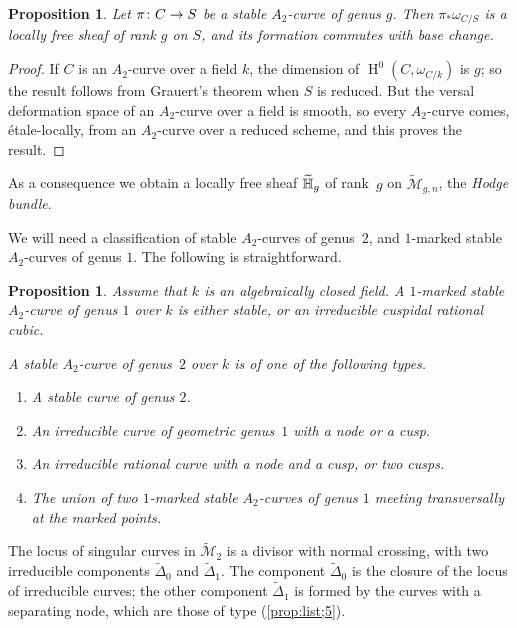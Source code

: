 \documentclass[a4paper, 10pt]{amsart}
\numberwithin{equation}{section}
\numberwithin{subsection}{section}
\newenvironment{enumerate1}
{\begin{enumerate}[\upshape (1)]}
	{\end{enumerate}}
\newtheorem{proposition}[theorem]{Proposition}
\theoremstyle{definition}
\theoremstyle{remark}
\newcommand\nome{testing}
\newcommand\call[1]{\label{#1}\renewcommand\nome{#1}}
\newcommand\itemref[1]{\item\label{\nome;#1}}
\newcommand\refpart[2]{(\ref{#1;#2})}
\renewcommand{\mathcal}{\mathscr}
\newcommand\arr{\ifinner\to\else\longrightarrow\fi}
\renewcommand\H{\operatorname{H}}
\newcommand{\mt}{\widetilde{\mathcal M}}
\newcommand{\dtil}{\widetilde{\Delta}}
\newcommand{\htil}{\widetilde{\HH}}
\begin{document}
	
	\begin{proposition}\label{prop:hodge-bundle}
		Let $\pi\colon C \arr S$ be a stable $A_2$-curve of genus $g$. Then $\pi_{*}{\omega}_{C/S}$ is a locally free sheaf of rank $g$ on $S$, and its formation commutes with base change.
	\end{proposition}
	
	\begin{proof}
		If $C$ is an $A_2$-curve over a field $k$, the dimension of $\H^{0}(C, \omega_{C/k})$ is $g$; so the result follows from Grauert's theorem when $S$ is reduced. But the versal deformation space of an $A_{2}$-curve over a field is smooth, so every $A_{2}$-curve comes, \'{e}tale-locally, from an $A_{2}$-curve over a reduced scheme, and this proves the result.
	\end{proof}
	
	As a consequence we obtain a locally free sheaf $\htil_{g}$ of rank~$g$ on $\mt_{g, n}$, the \emph{Hodge bundle}.
	
	We will need a classification of stable $A_2$-curves of genus~$2$, and $1$-marked stable $A_2$-curves of genus $1$. The following is straightforward.
	
	\begin{proposition}\call{prop:list} Assume that $k$ is an algebraically closed field. A $1$-marked stable $A_2$-curve of genus $1$ over $k$ is either stable, or an irreducible cuspidal rational cubic.
		
		A stable $A_2$-curve of genus~$2$ over $k$ is of one of the following types.
		
		\begin{enumerate1}
			
			\itemref{1} A stable curve of genus $2$.
			
			\itemref{2} An irreducible curve of geometric genus~$1$ with a node or a cusp.
			
			\itemref{3} An irreducible rational curve with a node and a cusp, or two cusps.
			
			\itemref{5} The union of two $1$-marked stable $A_2$-curves of genus $1$ meeting transversally at the marked points.
			
		\end{enumerate1}
	\end{proposition}
	
	The locus of singular curves in $\mt_{2}$ is a divisor with normal crossing, with two irreducible components $\dtil_{0}$ and $\dtil_{1}$. The component $\dtil_{0}$ is the closure of the locus of irreducible curves; the other component $\dtil_{1}$ is formed by the curves with a separating node, which are those of type \refpart{prop:list}{5}.
	
\end{document}
